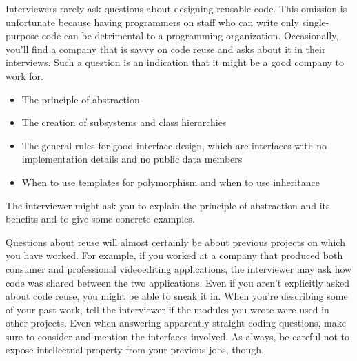 
Interviewers rarely ask questions about designing reusable code. This omission is unfortunate because having programmers on staff who can write only single-purpose code can be detrimental to a programming organization. Occasionally, you’ll find a company that is savvy on code reuse and asks about it in their interviews. Such a question is an indication that it might be a good company to work for.


\begin{itemize}
\item
The principle of abstraction

\item
The creation of subsystems and class hierarchies

\item
The general rules for good interface design, which are interfaces with no implementation details and no public data members

\item
When to use templates for polymorphism and when to use inheritance
\end{itemize}


The interviewer might ask you to explain the principle of abstraction and its benefits and to give some concrete examples.

Questions about reuse will almost certainly be about previous projects on which you have worked.
For example, if you worked at a company that produced both consumer and professional videoediting applications, the interviewer may ask how code was shared between the two applications. Even if you aren’t explicitly asked about code reuse, you might be able to sneak it in. When you’re describing some of your past work, tell the interviewer if the modules you wrote were used in other projects. Even when answering apparently straight coding questions, make sure to consider and mention the interfaces involved. As always, be careful not to expose intellectual property from your previous jobs, though.
















